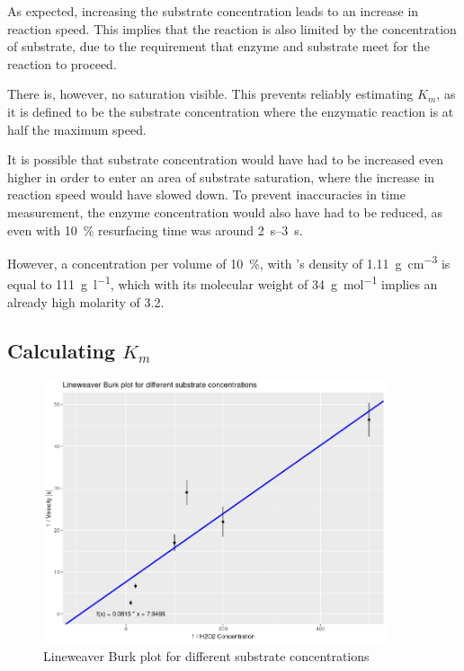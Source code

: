 \documentclass[a4paper,english]{scrreprt}
\begin{document}
As expected, increasing the substrate concentration leads to an increase in
reaction speed. This implies that the reaction is also limited by the
concentration of substrate, due to the requirement that enzyme and substrate
meet for the reaction to proceed.

There is, however, no saturation visible. This prevents reliably estimating
$K_m$, as it is defined to be the substrate concentration where the enzymatic
reaction is at half the maximum speed. 

It is possible that substrate concentration would have had to be increased even
higher in order to enter an area of substrate saturation, where the increase in
reaction speed would have slowed down. To prevent inaccuracies in time
measurement, the enzyme concentration would also have had to be reduced, as
even with \SI{10}{\percent}  resurfacing time was around
\SIrange{2}{3}{\s}.

However, a concentration per volume of \SI{10}{\percent}, with 's
density of \SI{1.11}{\g \per \cm^3} is equal to \SI{111}{\g \per \l}, which
with its molecular weight of \SI{34}{\g \per \mol} implies an already high
molarity of \SI{3.2}{\Molar}.

\subsection{Calculating $K_m$}

\begin{figure}
	\centering
	\includegraphics[width=0.9\textwidth]{img/substrate_concentration_lburk.png}
	\caption{Lineweaver Burk plot for different substrate concentrations}
	\label{fig:substrate_concentration_lburk}
\end{figure}
\end{document}
